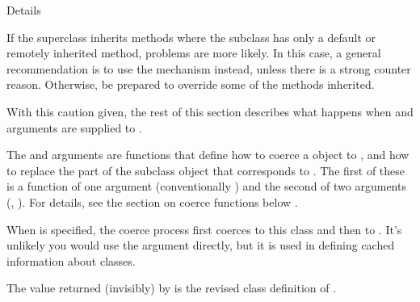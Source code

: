 \begin{Section}{Details}
\begin{enumerate}
If the superclass inherits methods where the subclass has only a
default or remotely inherited method, problems are more likely.
In this case, a general
recommendation is to use the  mechanism
instead, unless there is a strong counter reason. Otherwise, be prepared to
override some of  the methods inherited.

\end{enumerate}


With this caution given, the rest of this section describes what
happens when  and  arguments are supplied
to .

The  and  arguments are functions that
define how to coerce a  object to , and
how to replace the part of the subclass object that corresponds to
.  The first of these is a function of one argument
(conventionally ) and the second of two arguments
(, ).  For details, see the section on coerce
functions below .

When  is specified, the coerce process first coerces to
this class and then to .  It's unlikely you
would use the  argument directly, but it is used in defining
cached information about classes.

The value returned (invisibly) by
 is the revised class definition of .
\end{Section}
%
